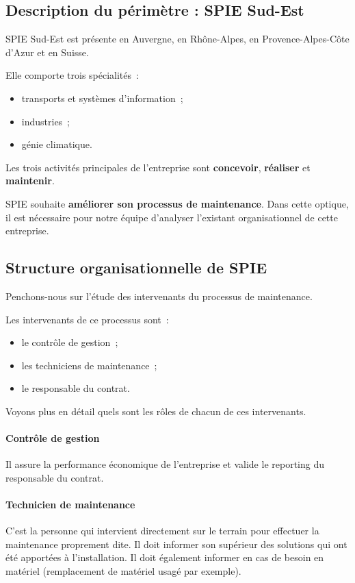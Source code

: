 \subsection{Description du périmètre : SPIE Sud-Est}
SPIE Sud-Est est présente en Auvergne, en Rhône-Alpes, en Provence-Alpes-Côte d'Azur et en Suisse.

Elle comporte trois spécialités~:
\begin{itemize}
	\item transports et systèmes d'information~;
	\item industries~;
	\item génie climatique.\\
\end{itemize}

Les trois activités principales de l'entreprise sont \textbf{concevoir}, \textbf{réaliser} et \textbf{maintenir}.


SPIE souhaite \textbf{améliorer son processus de maintenance}. Dans cette optique, il est nécessaire pour notre équipe d'analyser l'existant organisationnel de cette entreprise.

\subsection{Structure organisationnelle de SPIE}
Penchons-nous sur l'étude des intervenants du processus de maintenance.

Les intervenants de ce processus sont~:
\begin{itemize}
\item le contrôle de gestion~;
\item les techniciens de maintenance~;
\item le responsable du contrat.\\
\end{itemize}

Voyons plus en détail quels sont les rôles de chacun de ces intervenants.

\paragraph{Contrôle de gestion}{Il assure la performance économique de l'entreprise et valide le reporting du responsable du contrat.}
\paragraph{Technicien de maintenance}{C'est la personne qui intervient directement sur le terrain pour effectuer la maintenance proprement dite. Il doit informer son supérieur des solutions qui ont été apportées à l'installation. Il doit également informer en cas de besoin en matériel (remplacement de matériel usagé par exemple).}
